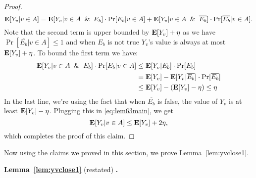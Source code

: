 \documentclass[letterpaper,11pt]{article}
\DeclareMathOperator{\E}{\ensuremath{\normalfont \textbf{E}}}
\newcommand{\restatelem}[2]{\noindent \textbf{Lemma~#1} (restated) \textbf{.} {\em #2}}
\begin{document}
\begin{proof}
    \begin{equation}\label{eq:lem63main}
    \E[Y_v | v \in A]  = \E[Y_v | v \in A \And E_b] \cdot \Pr[E_b | v \in A] + \E[Y_v | v \in A \And \overline{E_b}] \cdot \Pr[\overline{E_b} | v \in A]. 
    \end{equation}
    Note that the second term is upper bounded by $\E[Y_v] + \eta$ as we have $\Pr[\overline{E_b} | v \in A] \leq 1$ and when $E_b$ is not true $Y_v$'s value is always at most $\E[Y_v] + \eta$. To bound the first term we have:
    \begin{align*}
       \E[Y_v | v \in A \And E_b] \cdot \Pr[E_b | v \in A] & \leq
       \E[Y_v | E_b] \cdot \Pr[E_b] 
       \\ & = \E[Y_v] - \E[Y_v | \overline{E_b}] \cdot \Pr[\overline{E_b}]
       \\ & \leq \E[Y_v] - (\E[Y_v] - \eta) \leq \eta
    \end{align*}
    In the last line, we're using the fact that when $\overline{E_b}$ is false, the value of $Y_v$ is at least $\E[Y_v] - \eta$.
    Plugging this in  \eqref{eq:lem63main}, we get
    $$
     \E[Y_v | v \in A] \leq \E[Y_v] + 2 \eta,
    $$
    which completes the proof of this claim.
\end{proof}
Now using the claims we proved in this section, we prove Lemma~\ref{lem:yvclose1}.

\restatelem{\ref{lem:yvclose1}}{\lemyvaboutone{}}
 
\end{document}
